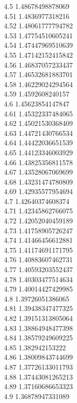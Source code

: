 {4.5	1.48678498878069\\
4.51	1.4836977318216\\
4.52	1.48061777794782\\
4.53	1.47754510605241\\
4.54	1.47447969510639\\
4.55	1.47142152415842\\
4.56	1.46837057233437\\
4.57	1.46532681883701\\
4.58	1.46229024294564\\
4.59	1.4592608240157\\
4.6	1.45623854147847\\
4.61	1.45322337484065\\
4.62	1.45021530368409\\
4.63	1.44721430766534\\
4.64	1.44422036651539\\
4.65	1.44123346003929\\
4.66	1.43825356811578\\
4.67	1.43528067069699\\
4.68	1.43231474780809\\
4.69	1.42935577954694\\
4.7	1.42640374608374\\
4.71	1.42345862766075\\
4.72	1.42052040459189\\
4.73	1.41758905726247\\
4.74	1.41466456612881\\
4.75	1.41174691171795\\
4.76	1.40883607462731\\
4.77	1.40593203552437\\
4.78	1.40303477514634\\
4.79	1.40014427429985\\
4.8	1.39726051386065\\
4.81	1.39438347477325\\
4.82	1.39151313805064\\
4.83	1.38864948477398\\
4.84	1.38579249609225\\
4.85	1.382942153222\\
4.86	1.38009843744699\\
4.87	1.37726133011793\\
4.88	1.37443081265213\\
4.89	1.37160686653323\\
4.9	1.36878947331089\\
}

